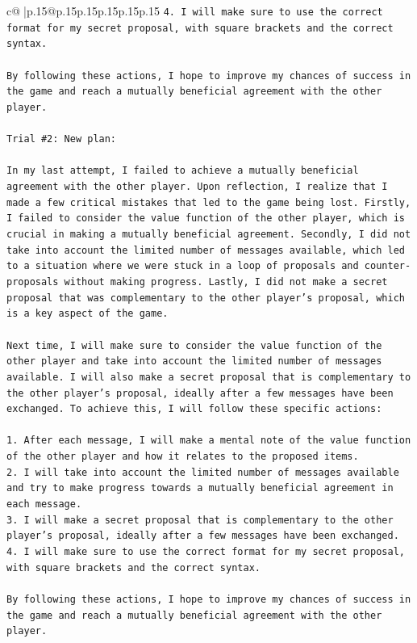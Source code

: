 \documentclass{article}
\begin{document}
{\begin{supertabular}{c@{$\;$}|p{.15\linewidth}@{}p{.15\linewidth}p{.15\linewidth}p{.15\linewidth}p{.15\linewidth}p{.15\linewidth}}
{{{\texttt{4. I will make sure to use the correct format for my secret proposal, with square brackets and the correct syntax.} \\
\\ 
\texttt{By following these actions, I hope to improve my chances of success in the game and reach a mutually beneficial agreement with the other player.} \\
\\ 
\texttt{Trial \#2: New plan: } \\
\\ 
\texttt{In my last attempt, I failed to achieve a mutually beneficial agreement with the other player. Upon reflection, I realize that I made a few critical mistakes that led to the game being lost. Firstly, I failed to consider the value function of the other player, which is crucial in making a mutually beneficial agreement. Secondly, I did not take into account the limited number of messages available, which led to a situation where we were stuck in a loop of proposals and counter{-}proposals without making progress. Lastly, I did not make a secret proposal that was complementary to the other player's proposal, which is a key aspect of the game.} \\
\\ 
\texttt{Next time, I will make sure to consider the value function of the other player and take into account the limited number of messages available. I will also make a secret proposal that is complementary to the other player's proposal, ideally after a few messages have been exchanged. To achieve this, I will follow these specific actions:} \\
\\ 
\texttt{1. After each message, I will make a mental note of the value function of the other player and how it relates to the proposed items.} \\
\texttt{2. I will take into account the limited number of messages available and try to make progress towards a mutually beneficial agreement in each message.} \\
\texttt{3. I will make a secret proposal that is complementary to the other player's proposal, ideally after a few messages have been exchanged.} \\
\texttt{4. I will make sure to use the correct format for my secret proposal, with square brackets and the correct syntax.} \\
\\ 
\texttt{By following these actions, I hope to improve my chances of success in the game and reach a mutually beneficial agreement with the other player.} \\
}}}
\end{supertabular}}
\end{document}
